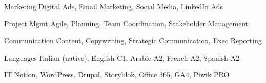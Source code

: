 

\begin{cvskills}

\cvskill
{Marketing } %
{Digital Ads, Email Marketing, Social Media, LinkedIn Ads}

\cvskill
{Project Mgmt} %
{Agile, Planning, Team Coordination, Stakeholder Management} %

\cvskill
{Communication} %
{Content, Copywriting, Strategic Communication, Exec Reporting} %



\cvskill
{Languages} %
{Italian (native), English C1, Arabic A2, French A2, Spanish A2} %


\cvskill
{IT} %
{Notion, WordPress, Drupal, Storyblok, Office 365, GA4, Piwik PRO} %

\end{cvskills}
